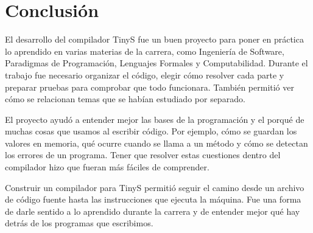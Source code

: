 \chapter{Conclusión}
\label{cap:conclusion}

El desarrollo del compilador TinyS fue un buen proyecto para poner en
práctica lo aprendido en varias materias de la carrera, como Ingeniería
de Software, Paradigmas de Programación, Lenguajes Formales y
Computabilidad. Durante el trabajo fue necesario organizar el código,
elegir cómo resolver cada parte y preparar pruebas para comprobar que
todo funcionara. También permitió ver cómo se relacionan temas que se
habían estudiado por separado.

El proyecto ayudó a entender mejor las bases de la programación y el
porqué de muchas cosas que usamos al escribir código. Por ejemplo, cómo
se guardan los valores en memoria, qué ocurre cuando se llama a un
método y cómo se detectan los errores de un programa. Tener que resolver
estas cuestiones dentro del compilador hizo que fueran más fáciles de
comprender.

Construir un compilador para TinyS permitió seguir el camino desde un archivo de código
fuente hasta las instrucciones que ejecuta la máquina. Fue una forma de
darle sentido a lo aprendido durante la carrera y de entender mejor qué
hay detrás de los programas que escribimos.

